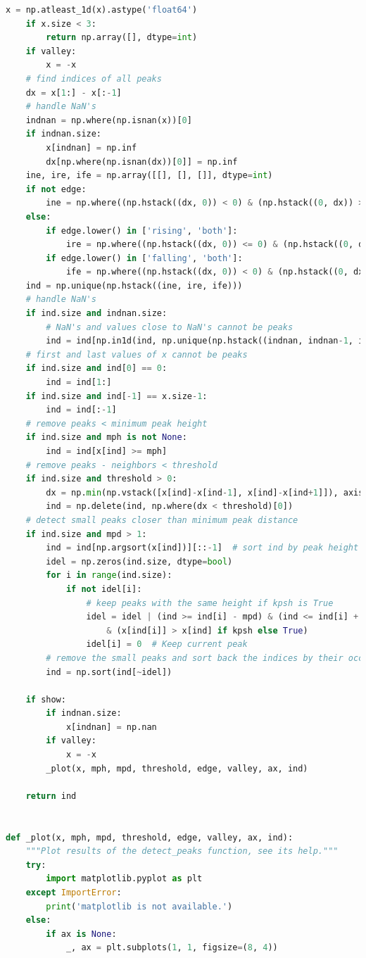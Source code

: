 \begin{lstlisting}[language=Python]
    x = np.atleast_1d(x).astype('float64')
    if x.size < 3:
        return np.array([], dtype=int)
    if valley:
        x = -x
    # find indices of all peaks
    dx = x[1:] - x[:-1]
    # handle NaN's
    indnan = np.where(np.isnan(x))[0]
    if indnan.size:
        x[indnan] = np.inf
        dx[np.where(np.isnan(dx))[0]] = np.inf
    ine, ire, ife = np.array([[], [], []], dtype=int)
    if not edge:
        ine = np.where((np.hstack((dx, 0)) < 0) & (np.hstack((0, dx)) > 0))[0]
    else:
        if edge.lower() in ['rising', 'both']:
            ire = np.where((np.hstack((dx, 0)) <= 0) & (np.hstack((0, dx)) > 0))[0]
        if edge.lower() in ['falling', 'both']:
            ife = np.where((np.hstack((dx, 0)) < 0) & (np.hstack((0, dx)) >= 0))[0]
    ind = np.unique(np.hstack((ine, ire, ife)))
    # handle NaN's
    if ind.size and indnan.size:
        # NaN's and values close to NaN's cannot be peaks
        ind = ind[np.in1d(ind, np.unique(np.hstack((indnan, indnan-1, indnan+1))), invert=True)]
    # first and last values of x cannot be peaks
    if ind.size and ind[0] == 0:
        ind = ind[1:]
    if ind.size and ind[-1] == x.size-1:
        ind = ind[:-1]
    # remove peaks < minimum peak height
    if ind.size and mph is not None:
        ind = ind[x[ind] >= mph]
    # remove peaks - neighbors < threshold
    if ind.size and threshold > 0:
        dx = np.min(np.vstack([x[ind]-x[ind-1], x[ind]-x[ind+1]]), axis=0)
        ind = np.delete(ind, np.where(dx < threshold)[0])
    # detect small peaks closer than minimum peak distance
    if ind.size and mpd > 1:
        ind = ind[np.argsort(x[ind])][::-1]  # sort ind by peak height
        idel = np.zeros(ind.size, dtype=bool)
        for i in range(ind.size):
            if not idel[i]:
                # keep peaks with the same height if kpsh is True
                idel = idel | (ind >= ind[i] - mpd) & (ind <= ind[i] + mpd) \
                    & (x[ind[i]] > x[ind] if kpsh else True)
                idel[i] = 0  # Keep current peak
        # remove the small peaks and sort back the indices by their occurrence
        ind = np.sort(ind[~idel])

    if show:
        if indnan.size:
            x[indnan] = np.nan
        if valley:
            x = -x
        _plot(x, mph, mpd, threshold, edge, valley, ax, ind)

    return ind


def _plot(x, mph, mpd, threshold, edge, valley, ax, ind):
    """Plot results of the detect_peaks function, see its help."""
    try:
        import matplotlib.pyplot as plt
    except ImportError:
        print('matplotlib is not available.')
    else:
        if ax is None:
            _, ax = plt.subplots(1, 1, figsize=(8, 4))


\end{lstlisting}
